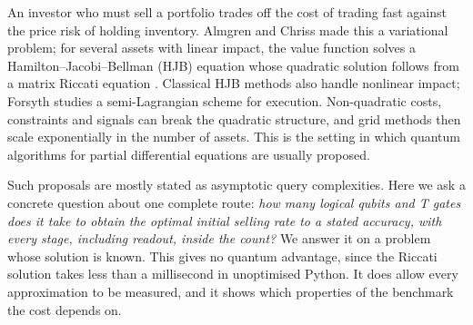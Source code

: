 \documentclass[11pt,a4paper]{article}
\theoremstyle{remark}
\begin{document}
An investor who must sell a portfolio trades off the cost of trading fast
against the price risk of holding inventory. Almgren and Chriss
\cite{ac} made this a variational problem; for several assets with linear
impact, the value function solves a Hamilton--Jacobi--Bellman (HJB)
equation whose quadratic solution follows from a matrix Riccati equation
\cite{bdg}. Classical HJB methods also handle nonlinear impact; Forsyth
\cite{forsyth} studies a semi-Lagrangian scheme for execution. Non-quadratic
costs, constraints and signals can break the quadratic structure, and grid
methods then scale exponentially in the number of assets. This is the setting in which quantum algorithms for partial
differential equations are usually proposed.

Such proposals are mostly stated as asymptotic query complexities. Here we
ask a concrete question about one complete route: \emph{how many logical
qubits and T gates does it take to obtain the optimal initial selling rate
to a stated accuracy, with every stage, including readout, inside the
count?} We answer it on a problem whose solution is known. This gives no
quantum advantage, since the Riccati solution takes less than a millisecond
in unoptimised Python. It does allow every approximation to be measured, and it
shows which properties of the benchmark the cost depends on.
\end{document}
